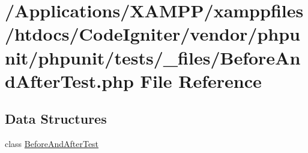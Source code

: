 \hypertarget{_before_and_after_test_8php}{}\section{/\+Applications/\+X\+A\+M\+P\+P/xamppfiles/htdocs/\+Code\+Igniter/vendor/phpunit/phpunit/tests/\+\_\+files/\+Before\+And\+After\+Test.php File Reference}
\label{_before_and_after_test_8php}
\subsection*{Data Structures}
\begin{DoxyCompactItemize}
\item 
class \mbox{\hyperlink{class_before_and_after_test}{Before\+And\+After\+Test}}
\end{DoxyCompactItemize}
